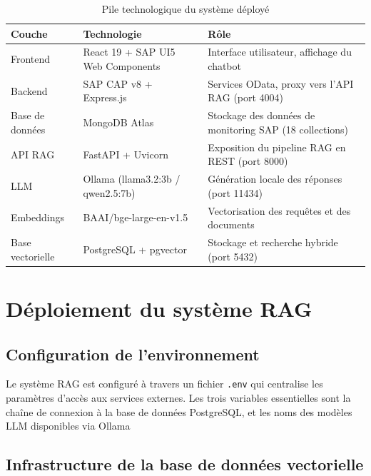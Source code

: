 \begin{table}[H]
\centering
\caption{Pile technologique du système déployé}
\label{tab:tech_stack}
\begin{tabularx}{\textwidth}{|l|l|X|}
\hline
\textbf{Couche} & \textbf{Technologie} & \textbf{Rôle} \\
\hline
Frontend & React 19 + SAP UI5 Web Components & Interface utilisateur, affichage du chatbot \\
\hline
Backend & SAP CAP v8 + Express.js & Services OData, proxy vers l'API RAG (port 4004) \\
\hline
Base de données & MongoDB Atlas & Stockage des données de monitoring SAP (18 collections) \\
\hline
API RAG & FastAPI + Uvicorn & Exposition du pipeline RAG en REST (port 8000) \\
\hline
LLM & Ollama (llama3.2:3b / qwen2.5:7b) & Génération locale des réponses (port 11434) \\
\hline
Embeddings & BAAI/bge-large-en-v1.5 & Vectorisation des requêtes et des documents \\
\hline
Base vectorielle & PostgreSQL + pgvector & Stockage et recherche hybride (port 5432) \\
\hline
\end{tabularx}
\end{table}



\section{Déploiement du système RAG}

\subsection{Configuration de l'environnement}

Le système RAG est configuré à travers un fichier \texttt{.env} qui centralise les paramètres d'accès aux services externes. Les trois variables essentielles sont la chaîne de connexion à la base de données PostgreSQL, et les noms des modèles LLM disponibles via Ollama

\subsection{Infrastructure de la base de données vectorielle}

